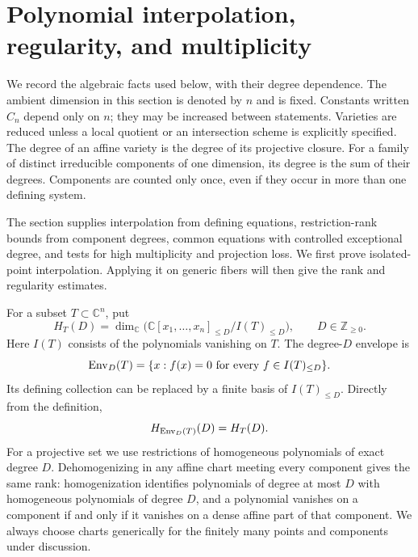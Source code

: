 \section{Polynomial interpolation, regularity, and multiplicity}
\label{sec:poly-section}

We record the algebraic facts used below, with their degree dependence.  The ambient dimension in this section is denoted by $n$ and is fixed.  Constants written $C_n$ depend only on $n$; they may be increased between statements. Varieties are reduced unless a local quotient or an intersection scheme is explicitly specified.  The degree of an affine variety is the degree of its projective closure.  For a family of distinct irreducible components of one dimension, its degree is the sum of their degrees.  Components are counted only once, even if they occur in more than one defining system.

The section supplies interpolation from defining equations, restriction-rank bounds from component degrees, common equations with controlled exceptional degree, and tests for high multiplicity and projection loss.  We first prove isolated-point interpolation.  Applying it on generic fibers will then give the rank and regularity estimates.

For a subset $T\subset\mathbb{C}^n$, put
\[
 H_T(D)=\dim_{\mathbb{C}}\bigl(\mathbb{C}[x_1,\ldots,x_n]_{\le D}/
           I(T)_{\le D}\bigr),\qquad D\in\mathbb{Z}_{\ge0}.
\]
Here $I(T)$ consists of the polynomials vanishing on $T$.  The degree-$D$ envelope is
\[
 \operatorname{Env}_D(T)=\{x:f(x)=0\text{ for every }f\in I(T)_{\le D}\}.
\]
Its defining collection can be replaced by a finite basis of $I(T)_{\le D}$.  Directly from the definition,
\begin{equation}\label{eq:poly-envelope-equality}
 H_{\operatorname{Env}_D(T)}(D)=H_T(D).
\end{equation}
For a projective set we use restrictions of homogeneous polynomials of exact degree $D$.  Dehomogenizing in any affine chart meeting every component gives the same rank: homogenization identifies polynomials of degree at most $D$ with homogeneous polynomials of degree $D$, and a polynomial vanishes on a component if and only if it vanishes on a dense affine part of that component.  We always choose charts generically for the finitely many points and components under discussion.


